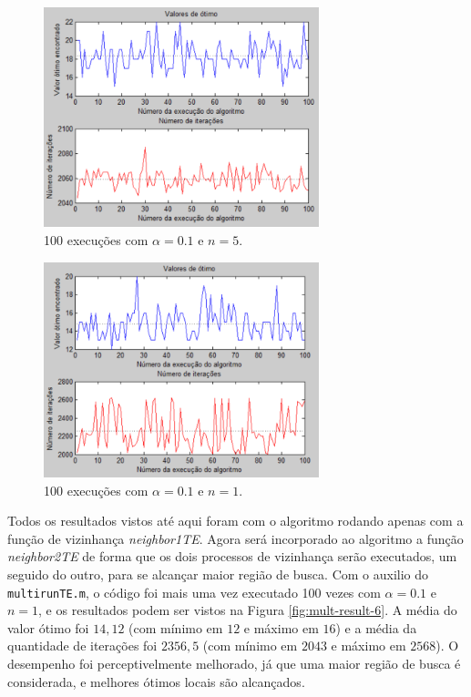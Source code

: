 \documentclass[conference]{IEEEtran}
\begin{document}
	\begin{figure}[h]
		\centering
		\includegraphics[width=8cm]{img/mult-result-4.png}
		\caption{100 execuções com $\alpha = 0.1$ e $n = 5$.}
		\label{fig:mult-result-4}
	\end{figure}
	
	\begin{figure}[h]
		\centering
		\includegraphics[width=8cm]{img/mult-result-5.png}
		\caption{100 execuções com $\alpha = 0.1$ e $n = 1$.}
		\label{fig:mult-result-5}
	\end{figure}
	\newpage
Todos os resultados vistos até aqui foram com o algoritmo rodando apenas com a função de vizinhança \textit{neighbor1TE}. Agora será incorporado ao algoritmo a função \textit{neighbor2TE} de forma que os dois processos de vizinhança serão executados, um seguido do outro, para se alcançar maior região de busca. Com o auxilio do \texttt{multirunTE.m}, o código foi mais uma vez executado 100 vezes com $\alpha = 0.1$ e $n = 1$, e os resultados podem ser vistos na Figura \ref{fig:mult-result-6}. A média do valor ótimo foi $14,12$ (com mínimo em $12$ e máximo em $16$) e a média da quantidade de iterações foi $2356,5$ (com mínimo em $2043$ e máximo em $2568$). O desempenho foi perceptivelmente melhorado, já que uma maior região de busca é considerada, e melhores ótimos locais são alcançados.
\end{document}
